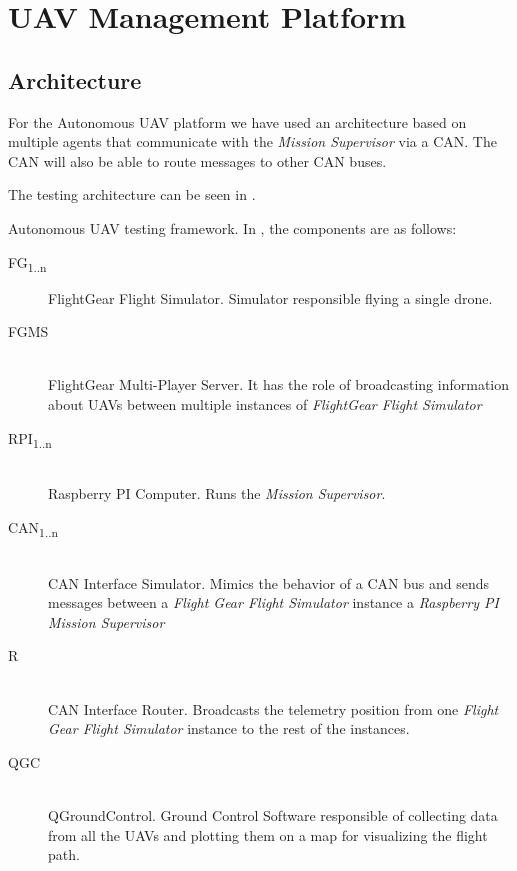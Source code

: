 \chapter{UAV Management Platform}
\label{chapter:uav-management-framework}

\section{Architecture}
\label{sec:architecture}
For the Autonomous UAV platform we have used an architecture based on multiple
agents that communicate with the \textit{Mission Supervisor} via a CAN.
The CAN will also be able to route messages
to other CAN buses. 

The testing architecture can be seen in  .

{Autonomous UAV testing framework}.
\newpage
In , the components are as
follows:
\begin{description}
\item [FG\textsubscript{1..n}] FlightGear Flight Simulator. Simulator responsible
flying a single drone.
\item [FGMS] \hfill \\ FlightGear Multi-Player Server. It has the role of broadcasting
information about UAVs between multiple instances of \textit{FlightGear Flight Simulator}
\item [RPI\textsubscript{1..n}] \hfill \\Raspberry PI Computer. Runs the \textit{Mission Supervisor}.
\item [CAN\textsubscript{1..n}] \hfill \\ CAN Interface Simulator. Mimics the behavior of 
a CAN bus and sends messages between a \textit{Flight Gear Flight Simulator} 
instance a \textit{Raspberry PI Mission Supervisor}
\item [R] \hfill \\ CAN Interface Router. Broadcasts the telemetry position from one
\textit{Flight Gear Flight Simulator} instance to the rest of the instances.
\item [QGC] \hfill \\ QGroundControl. Ground Control Software responsible of collecting data
from all the UAVs and plotting them on a map for visualizing the flight path.
\end{description}

